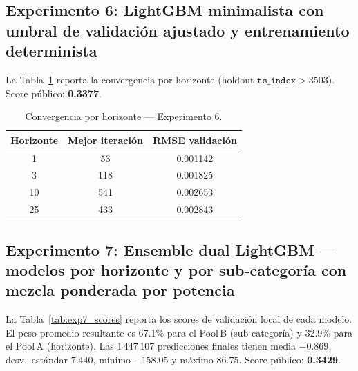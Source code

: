 \documentclass{article}
\begin{document}
\subsection{Experimento 6: LightGBM minimalista con umbral de validación ajustado y entrenamiento determinista}

La Tabla~\ref{tab:exp6_conv} reporta la convergencia por horizonte (holdout $\texttt{ts\_index} > 3503$). Score público: \textbf{0.3377}.

\begin{table}[h!]
  \caption{Convergencia por horizonte — Experimento 6.}
  \label{tab:exp6_conv}
  \centering
  \begin{tabular}{ccc}
    \toprule
    Horizonte & Mejor iteración & RMSE validación \\
    \midrule
    1  &  53 & 0.001142 \\
    3  & 118 & 0.001825 \\
    10 & 541 & 0.002653 \\
    25 & 433 & 0.002843 \\
    \bottomrule
  \end{tabular}
\end{table}

\subsection{Experimento 7: Ensemble dual LightGBM — modelos por horizonte y por sub-categoría con mezcla ponderada por potencia}

La Tabla~\ref{tab:exp7_scores} reporta los scores de validación local de cada modelo. El peso promedio resultante es 67.1\% para el Pool\,B (sub-categoría) y 32.9\% para el Pool\,A (horizonte). Las 1\,447\,107 predicciones finales tienen media $-0.869$, desv.~estándar $7.440$, mínimo $-158.05$ y máximo $86.75$. Score público: \textbf{0.3429}.
\end{document}
